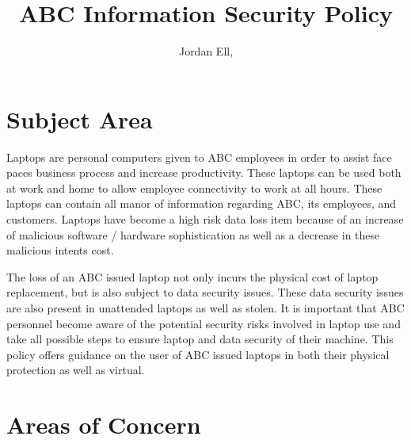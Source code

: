 \documentclass[DIV=calc, paper=a4, fontsize=11pt, twocolumn]{scrartcl}	 %
\title{ABC Information Security Policy} %
\author{Jordan Ell, } %
\date{} %
\begin{document}
\maketitle %

\thispagestyle{fancy} %


\section*{Subject Area}

Laptops are personal computers given to ABC employees in order to assist
face paces business process and increase productivity. These laptops
can be used both at work and home to allow employee connectivity to work
at all hours. These laptops can contain all manor of information regarding
ABC, its employees, and customers. Laptops have become a high risk data loss
item because of an increase of malicious software / hardware sophistication
as well as a decrease in these malicious intents cost.

The loss of an ABC issued laptop not only incurs the physical cost of
laptop replacement, but is also subject to data security issues. These data
security issues are also present in unattended laptops as well as stolen. It
is important that ABC personnel become aware of the potential security risks
involved in laptop use and take all possible steps to ensure laptop and data
security of their machine. This policy offers guidance on the user of ABC 
issued laptops in both their physical protection as well as virtual.

\section*{Areas of Concern}
\end{document}
